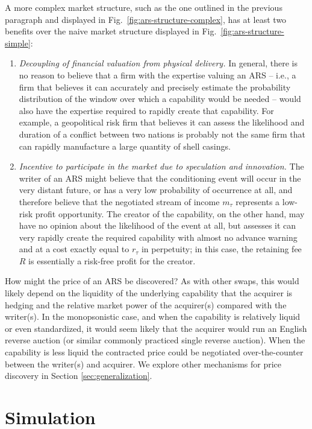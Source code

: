 \documentclass{article}
\begin{document}
A more complex market structure, such as the one outlined in the previous paragraph and displayed in Fig.\ \ref{fig:ars-structure-complex}, has at least two benefits over the naive market structure displayed in Fig.\ \ref{fig:ars-structure-simple}:
\begin{enumerate}
    \item \textit{Decoupling of financial valuation from physical delivery.} In general, there is no reason to believe that a firm with the expertise valuing an ARS -- i.e., a firm that believes it can accurately and precisely estimate the probability distribution of the window over which a capability would be needed -- would also have the expertise required to rapidly create that capability. For example, a geopolitical risk firm that believes it can assess the likelihood and duration of a conflict between two nations is probably not the same firm that can rapidly manufacture a large quantity of shell casings. 
    \item \textit{Incentive to participate in the market due to speculation and innovation.} The writer of an ARS might believe that the conditioning event will occur in the very distant future, or has a very low probability of occurrence at all, and therefore believe that the negotiated stream of income $m_\tau$ represents a low-risk profit opportunity.
    The creator of the capability, on the other hand, may have no opinion about the likelihood of the event at all, but assesses it can very rapidly create the required capability with almost no advance warning and at a cost exactly equal to $r_\tau$ in perpetuity; in this case, the retaining fee $R$ is essentially a risk-free profit for the creator.
\end{enumerate}

How might the price of an ARS be discovered?
As with other swaps, this would likely depend on the liquidity of the underlying capability that the acquirer is hedging and the relative market power of the acquirer(s) compared with the writer(s).
In the monopsonistic case, and when the capability is relatively liquid or even standardized, it would seem likely that the acquirer would run an English reverse auction (or similar commonly practiced single reverse auction).
When the capability is less liquid the contracted price could be negotiated over-the-counter between the writer(s) and acquirer.
We explore other mechanisms for price discovery in Section \ref{sec:generalization}.

\section{Simulation}\label{sec:simulation}
\end{document}
